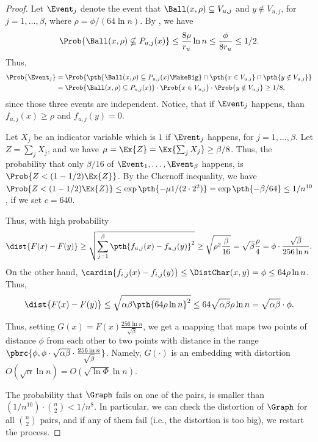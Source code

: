 \begin{proof}
    Let $\Event_j$ denote the event that $\Ball(x,\rho) \subseteq
    V_{u,j}$ and $y \notin V_{u,j}$, for $j=1,\ldots, \beta$, where
    $\rho=\phi /(64 \ln n)$. By , we have
    \begin{equation*}
    \Prob{\Ball(x,\rho) \nsubseteq P_{u,j}(x) } \leq \frac{8\rho}{r_u}
    \ln n \leq \frac{\phi}{8r_u}
    \leq 1/2.
    \end{equation*}
    Thus, 
    \begin{align*}
      \Prob{\Event_j}%
      &=%
        \Prob{\pth{\Ball(x,\rho) \subseteq
        P_{u,j}(x) \MakeBig }
        \cap \pth{x \in V_{u,j}} \cap \pth{ y \notin V_{u,j}} }%
      \\&%
      =%
      \Prob{\Ball(x,\rho) \subseteq P_{u,j}(x) } \cdot 
      \Prob{ x \in V_{u,j}} \cdot
      \Prob{ y \notin V_{u,j} } \geq 1/8,
    \end{align*}
    since those three events are independent.  Notice, that if
    $\Event_j$ happens, than $f_{u,j}(x) \geq \rho$ and
    $f_{u,j}(y)=0$.
    
    Let $X_j$ be an indicator variable which is $1$ if $\Event_j$
    happens, for $j=1,\ldots,\beta$. Let $Z = \sum_j X_j$, and we have
    $\mu = \Ex{Z } = \Ex{ \sum_j X_j} \geq \beta/8$. Thus, the
    probability that only $\beta/16$ of
    $\Event_1, \ldots, \Event_\beta$ happens, is
    $\Prob{Z < (1-1/2)\Ex{Z}}$. By the Chernoff inequality, we have
    $\Prob{Z < (1-1/2)\Ex{Z}} \leq \exp \pth{ - \mu 1/(2\cdot 2^2)} =
    \exp \pth{ -\beta/64} \leq 1/n^{10}$, if we set $c=640$.
    
    Thus, with high probability
    \begin{equation*}
    \dist{F(x) - F(y)} \geq \sqrt{\sum_{j=1}^{\beta} \pth{f_{u,j}(x) -
          f_{u,j}(y)}^2 }\geq \sqrt{ \rho^2 \frac{\beta}{16}} = 
    \sqrt{\beta} \frac{\rho}{4} = \phi \cdot \frac{\sqrt{\beta}}{256
          \ln n}.
    \end{equation*}    
    On the other hand, $\cardin{f_{i,j}(x) - f_{i,j}(y)} \leq
    \DistChar(x,y) = \phi \leq 64 \rho \ln n$. Thus,
    \begin{equation*}
    \dist{F(x) - F(y)} \leq \sqrt{\alpha \beta \pth{64 \rho \ln n}^2 } 
    \leq 64 \sqrt{\alpha \beta} \rho \ln n = \sqrt{\alpha \beta} \cdot
    \phi.
    \end{equation*}
    
    Thus, setting $G(x) = F(x) \frac{256 \ln n}{\sqrt{\beta}}$, we get
    a mapping that maps two points of distance $\phi$ from each other
    to two points with distance in the range $\pbrc{\phi , \phi \cdot
       \sqrt{\alpha \beta} \cdot \frac{256 \ln n}{\sqrt{\beta}} 
    }$. Namely, $G(\cdot)$ is an embedding with distortion $O(
    \sqrt{\alpha} \ln n) = O( \sqrt{\ln \Phi} \ln n)$.

    The probability that $\Graph$ fails on one of the pairs, is
    smaller than $(1/n^{10}) \cdot \binom{n}{2} < 1/n^{8}$. In
    particular, we can check the distortion of $\Graph$ for all
    $\binom{n}{2}$ pairs, and if any of them fail (i.e., the
    distortion is too big), we restart the process.
\end{proof}



